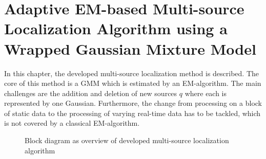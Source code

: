 
\chapter[Adaptive EM-based Multi-source Localization Algorithm]{Adaptive EM-based Multi-source Localization Algorithm using a Wrapped Gaussian Mixture Model}
\label{chap:Proposed}

In this chapter, the developed multi-source localization method is described.
The core of this method is a \ac{GMM} which is estimated by an \ac{EM}-algorithm. The main challenges are the addition and deletion of new sources $q$ where each is represented by one Gaussian. Furthermore, the change from processing on a block of static data to the processing of varying real-time data has to be tackled, which is not covered by a classical \ac{EM}-algorithm. \\

\begin{figure}[!h]
	\centering
    
	\caption{Block diagram as overview of developed multi-source localization algorithm}
	\label{fig:overview_proposed}
\end{figure}

